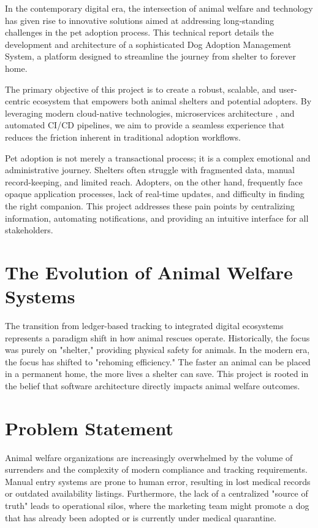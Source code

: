 In the contemporary digital era, the intersection of animal welfare and technology has given rise to innovative solutions aimed at addressing long-standing challenges in the pet adoption process. This technical report details the development and architecture of a sophisticated Dog Adoption Management System, a platform designed to streamline the journey from shelter to forever home.

The primary objective of this project is to create a robust, scalable, and user-centric ecosystem that empowers both animal shelters and potential adopters. By leveraging modern cloud-native technologies, microservices architecture \cite{microservices_fowler}, and automated CI/CD pipelines, we aim to provide a seamless experience that reduces the friction inherent in traditional adoption workflows.

Pet adoption is not merely a transactional process; it is a complex emotional and administrative journey. Shelters often struggle with fragmented data, manual record-keeping, and limited reach. Adopters, on the other hand, frequently face opaque application processes, lack of real-time updates, and difficulty in finding the right companion. This project addresses these pain points by centralizing information, automating notifications, and providing an intuitive interface for all stakeholders.

\section{The Evolution of Animal Welfare Systems}
The transition from ledger-based tracking to integrated digital ecosystems represents a paradigm shift in how animal rescues operate. Historically, the focus was purely on "shelter," providing physical safety for animals. In the modern era, the focus has shifted to "rehoming efficiency." The faster an animal can be placed in a permanent home, the more lives a shelter can save. This project is rooted in the belief that software architecture directly impacts animal welfare outcomes.

\section{Problem Statement}
Animal welfare organizations are increasingly overwhelmed by the volume of surrenders and the complexity of modern compliance and tracking requirements. Manual entry systems are prone to human error, resulting in lost medical records or outdated availability listings. Furthermore, the lack of a centralized "source of truth" leads to operational silos, where the marketing team might promote a dog that has already been adopted or is currently under medical quarantine.

